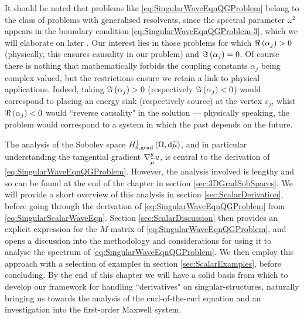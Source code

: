 It should be noted that problems like \eqref{eq:SingularWaveEqnQGProblem} belong to the class of problems with generalised resolvents, since the spectral parameter $\omega^2$ appears in the boundary condition \eqref{eq:SingularWaveEqnQGProblem-3}, which we will elaborate on later .
Our interest lies in those problems for which $\Re\left( \alpha_j \right)>0$ (physically, this ensures causality in our problem) and $\Im\left( \alpha_j \right) = 0$.
Of course there is nothing that mathematically forbids the coupling constants $\alpha_j$ being complex-valued, but the restrictions ensure we retain a link to physical applications. 
Indeed, taking $\Im\left( \alpha_j \right) > 0$ (respectively $\Im\left( \alpha_j \right) < 0$) would correspond to placing an energy sink (respectively source) at the vertex $v_j$, whist $\Re\left( \alpha_j \right)<0$ would ``reverse causality" in the solution --- physically speaking, the problem would correspond to a system in which the past depends on the future.

The analysis of the Sobolev space $H^1_{\theta, \mathrm{grad}}\left( \Omega, \mathrm{d}\widetilde{\mu} \right)$, and in particular understanding the tangential gradient $\nabla^{\theta}_{\widetilde{\mu}}u$, is central to the derivation of \eqref{eq:SingularWaveEqnQGProblem}.
However, the analysis involved is lengthy and so can be found at the end of the chapter in section \ref{sec:3DGradSobSpaces}.
We will provide a short overview of this analysis in section \ref{sec:ScalarDerivation}, before going through the derivation of \eqref{eq:SingularWaveEqnQGProblem} from \eqref{eq:SingularScalarWaveEqn}.
Section \ref{sec:ScalarDiscussion} then provides an explicit expression for the $M$-matrix of \eqref{eq:SingularWaveEqnQGProblem}, and opens a discussion into the methodology and considerations for using it to analyse the spectrum of \eqref{eq:SingularWaveEqnQGProblem}.
We then employ this approach with a selection of examples in section \ref{sec:ScalarExamples}, before concluding.
By the end of this chapter we will have a solid basis from which to develop our framework for handling ``derivatives" on singular-structures, naturally bringing us towards the analysis of the curl-of-the-curl equation  and an investigation into the first-order Maxwell system.
